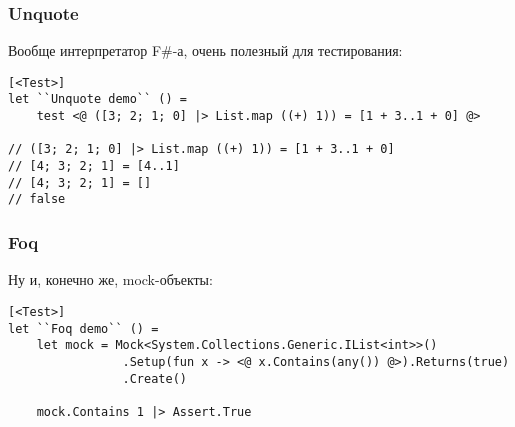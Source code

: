 \documentclass[xetex,mathserif,serif]{beamer}
\begin{document}
	\begin{frame}[fragile]
		\frametitle{Unquote}
		Вообще интерпретатор F\#-а, очень полезный для тестирования:
		\begin{verbatim}
[<Test>]
let ``Unquote demo`` () =
    test <@ ([3; 2; 1; 0] |> List.map ((+) 1)) = [1 + 3..1 + 0] @>

// ([3; 2; 1; 0] |> List.map ((+) 1)) = [1 + 3..1 + 0]
// [4; 3; 2; 1] = [4..1]
// [4; 3; 2; 1] = []
// false
		\end{verbatim}
	\end{frame}

	\begin{frame}[fragile]
		\frametitle{Foq}
		Ну и, конечно же, mock-объекты:
		\begin{verbatim}
[<Test>]
let ``Foq demo`` () =
    let mock = Mock<System.Collections.Generic.IList<int>>()
                .Setup(fun x -> <@ x.Contains(any()) @>).Returns(true)
                .Create()

    mock.Contains 1 |> Assert.True
		\end{verbatim}
	\end{frame}
\end{document}
